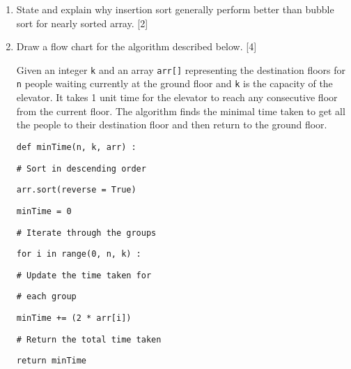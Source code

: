 \begin{enumerate}
\item State and explain why insertion sort generally perform better than
bubble sort for nearly sorted array. \hfill{}{[}2{]}
\item Draw a flow chart for the algorithm described below. \hfill{}{[}4{]}

Given an integer \texttt{k} and an array \texttt{arr{[}{]}} representing
the destination floors for \texttt{n} people waiting currently at
the ground floor and \texttt{k} is the capacity of the elevator. It
takes 1 unit time for the elevator to reach any consecutive floor
from the current floor. The algorithm finds the minimal time taken
to get all the people to their destination floor and then return to
the ground floor. 

\noindent\begin{minipage}[t]{1\columnwidth}%
\texttt{def minTime(n, k, arr) : }

\texttt{\qquad{}\# Sort in descending order }

\texttt{\qquad{}arr.sort(reverse = True) }

\texttt{\qquad{}minTime = 0 }

\texttt{\qquad{}\# Iterate through the groups }

\texttt{\qquad{}for i in range(0, n, k) : }

\texttt{\qquad{}\qquad{}\# Update the time taken for }

\texttt{\qquad{}\qquad{}\# each group }

\texttt{\qquad{}\qquad{}minTime += (2 {*} arr{[}i{]}) }

\texttt{\qquad{}\# Return the total time taken }

\texttt{\qquad{}return minTime}%
\end{minipage} 
\end{enumerate}